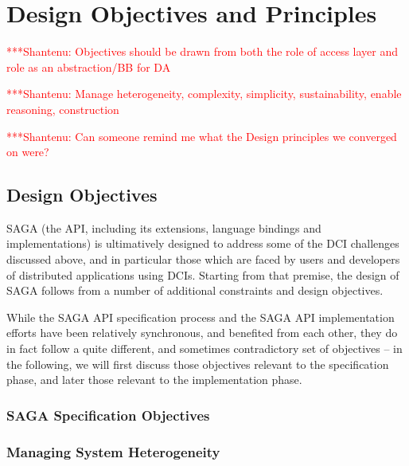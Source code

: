 \documentclass[a4paper,10pt]{article}
\newcommand{\jhanote}[1]{  {\textcolor{red}  { ***Shantenu: #1 }}}
\newcommand{\jhanote}[1]{}
\begin{document}
\section{Design Objectives and Principles}\label{saga_impls}


 \jhanote{Objectives should be drawn from both the role of access
   layer and role as an abstraction/BB for DA}

 \jhanote{Manage heterogeneity, complexity, simplicity,
   sustainability, enable reasoning, construction}

 \jhanote{Can someone remind me what the Design principles we
   converged on were?}

 \subsection{Design Objectives}


  SAGA (the API, including its extensions, language bindings and
  implementations) is ultimatively designed to address some of the DCI
  challenges discussed above, and in particular those which are faced
  by users and developers of distributed applications using DCIs.
  Starting from that premise, the design of SAGA follows from a number
  of additional constraints and design objectives.

  While the SAGA API specification process and the SAGA API
  implementation efforts have been relatively synchronous, and
  benefited from each other, they do in fact follow a quite different,
  and sometimes contradictory set of objectives -- in the following,
  we will first discuss those objectives relevant to the specification
  phase, and later those relevant to the implementation phase.

  \subsubsection{SAGA Specification Objectives}

   \subsubsection*{Managing System Heterogeneity}
\end{document}
